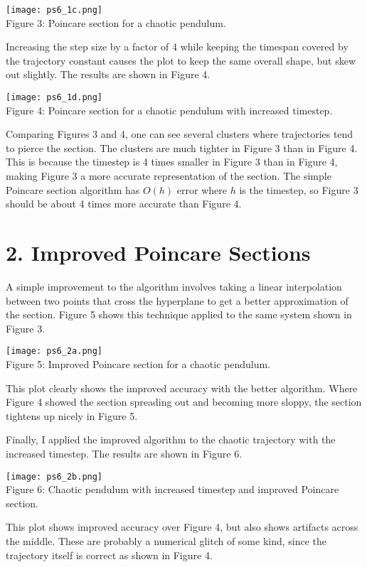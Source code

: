 \documentclass[12pt, letterpaper]{article}
\begin{document}
\begin{center}
\texttt{[image: ps6\_1c.png]}
\\
Figure 3: Poincare section for a chaotic pendulum.
\end{center}

Increasing the step size by a factor of 4 while keeping the timespan covered by
the trajectory constant causes the plot to keep the same overall shape, but skew
out slightly. The results are shown in Figure 4.

\begin{center}
\texttt{[image: ps6\_1d.png]}
\\
Figure 4: Poincare section for a chaotic pendulum with increased timestep.
\end{center}

Comparing Figures 3 and 4, one can see several clusters where trajectories tend
to pierce the section. The clusters are much tighter in Figure 3 than in Figure
4. This is because the timestep is 4 times smaller in Figure 3 than in Figure 4,
making Figure 3 a more accurate representation of the section. The simple 
Poincare section algorithm has $O(h)$ error where $h$ is the timestep, so Figure 
3 should be about 4 times more accurate than Figure 4.

\section*{2. Improved Poincare Sections}

A simple improvement to the algorithm involves taking a linear interpolation
between two points that cross the hyperplane to get a better approximation of 
the section. Figure 5 shows this technique applied to the same system shown in 
Figure 3.

\begin{center}
\texttt{[image: ps6\_2a.png]}
\\
Figure 5: Improved Poincare section for a chaotic pendulum.
\end{center}

This plot clearly shows the improved accuracy with the better algorithm. Where
Figure 4 showed the section spreading out and becoming more sloppy, the section
tightens up nicely in Figure 5. 

Finally, I applied the improved algorithm to the chaotic trajectory with the
increased timestep. The results are shown in Figure 6.

\begin{center}
\texttt{[image: ps6\_2b.png]}
\\
Figure 6: Chaotic pendulum with increased timestep and improved Poincare section.
\end{center}

This plot shows improved accuracy over Figure 4, but also shows artifacts across
the middle. These are probably a numerical glitch of some kind, since the 
trajectory itself is correct as shown in Figure 4.
\end{document}
